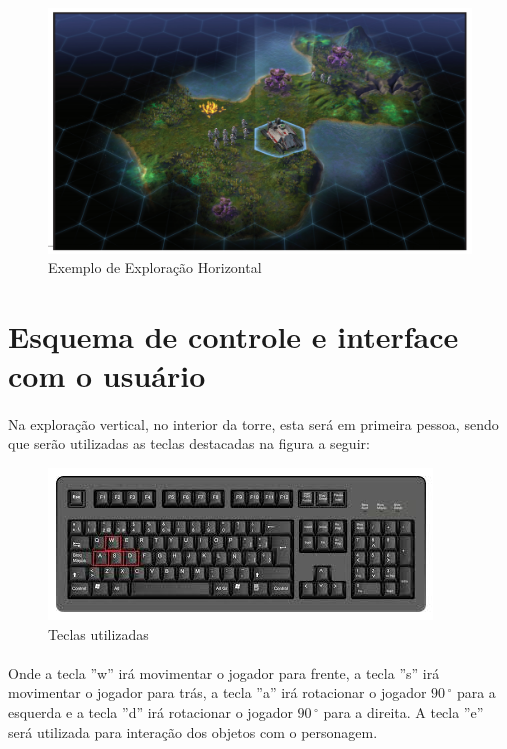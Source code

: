 \documentclass[11pt]{article} %
\begin{document}
\begin{figure}[!htp]
\centering
\includegraphics[scale=0.3]{res/resources.png}
\caption{Exemplo de Exploração Horizontal}
\label{Dungeon Crawler}
\end{figure}

\section{Esquema de controle e interface com o usuário}

\paragraph{}Na exploração vertical, no interior da torre, esta será em primeira pessoa, sendo que serão utilizadas as teclas destacadas na figura a seguir:\\

\begin{figure}[!htp]
\centering
\includegraphics[scale=0.75]{res/keyboard.jpg}
\caption{Teclas utilizadas}
\label{Teclado}
\end{figure}

\paragraph{}Onde a tecla ''w'' irá movimentar o jogador para frente, a tecla ''s'' irá movimentar o jogador para trás, a tecla ''a'' irá rotacionar o jogador $90\,^{\circ}$ para a esquerda e a tecla ''d'' irá rotacionar o jogador $90\,^{\circ}$ para a direita. A tecla ''e'' será utilizada para interação dos objetos com o personagem.
\end{document}
